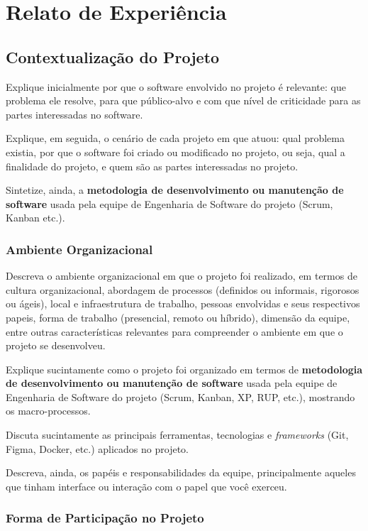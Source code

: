 \chapter{Relato de Experiência}
\label{cap:relato}

\section{Contextualização do Projeto}

Explique inicialmente  por que o software envolvido no projeto é relevante: que problema ele resolve, para que público-alvo e com que nível de criticidade para as partes interessadas no software.

Explique, em seguida, o cenário de cada projeto em que atuou: qual problema existia, por que o software foi criado ou modificado no projeto, ou seja, qual a finalidade do projeto, e quem são as partes interessadas no projeto.

Sintetize, ainda, a \textbf{metodologia de desenvolvimento ou manutenção de software} usada pela equipe de Engenharia de Software do projeto (Scrum, Kanban etc.). 

\subsection{Ambiente Organizacional}

Descreva o ambiente organizacional em que o projeto foi realizado, em termos de cultura organizacional, abordagem de processos (definidos ou informais, rigorosos ou ágeis), local e infraestrutura de trabalho, pessoas envolvidas e seus respectivos papeis, forma de trabalho (presencial, remoto ou híbrido), dimensão da equipe, entre outras características relevantes para compreender o ambiente em que o projeto se desenvolveu.


Explique sucintamente como o projeto foi organizado em termos de \textbf{metodologia de desenvolvimento ou manutenção de software} usada pela equipe de Engenharia de Software do projeto (Scrum, Kanban, XP, RUP, etc.), mostrando os macro-processos.

Discuta sucintamente as principais ferramentas, tecnologias e \textit{frameworks} (Git, Figma, Docker, etc.) aplicados no projeto.

Descreva, ainda, os papéis e responsabilidades da equipe, principalmente aqueles que tinham interface ou interação com o papel que você exerceu.

\subsection{Forma de Participação no Projeto}

